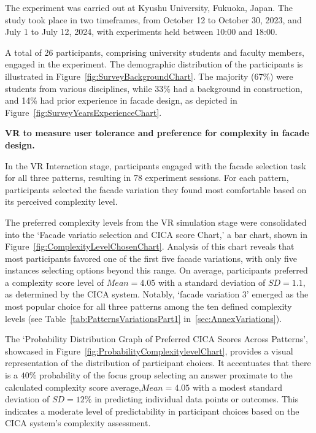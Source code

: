 
The experiment was carried out at Kyushu University, Fukuoka, Japan.
The study took place in two timeframes, from October 12 to October 30, 2023, and July 1 to July 12, 2024, with experiments held between 10:00 and 18:00.

A total of 26 participants, comprising university students and faculty members, engaged in the experiment.
The demographic distribution of the participants is illustrated in Figure~\ref{fig:SurveyBackgroundChart}.
The majority (67\%) were students from various disciplines, while 33\% had a background in construction, and 14\% had prior experience in facade design, as depicted in Figure~\ref{fig:SurveyYearsExperienceChart}.

\textbf{VR to measure user tolerance and preference for complexity in facade design.}

In the VR Interaction stage, participants engaged with the facade selection task for all three patterns, resulting in 78 experiment sessions.
For each pattern, participants selected the facade variation they found most comfortable based on its perceived complexity level.


The preferred complexity levels from the VR simulation stage were consolidated into the `Facade variatio selection and CICA score Chart,' a bar chart, shown in Figure~\ref{fig:ComplexityLevelChosenChart}.
Analysis of this chart reveals that most participants favored one of the first five facade variations, with only five instances selecting options beyond this range.
On average, participants preferred a complexity score level of \(Mean = 4.05\) with a standard deviation of \(SD = 1.1\), as determined by the CICA system.
Notably, `facade variation 3'  emerged as the most popular choice for all three patterns among the ten defined complexity levels (see Table~\ref{tab:PatternsVariationsPart1} in~\ref{sec:AnnexVariations}).


The `Probability Distribution Graph of Preferred CICA Scores Across Patterns', showcased in Figure~\ref{fig:ProbabilityComplexitylevelChart}, provides a visual representation of the distribution of participant choices.
It accentuates that there is a \(40\%\) probability of the focus group selecting an answer proximate to the calculated complexity score average,\(Mean = 4.05\) with a modest standard deviation of \(SD = 12\%\) in predicting individual data points or outcomes.
 This indicates a moderate level of predictability in participant choices based on the CICA system's complexity assessment.

